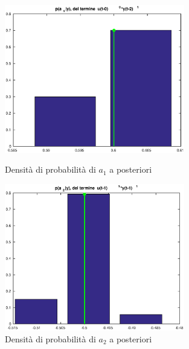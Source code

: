 \documentclass[10pt,a4paper,oneside,openany,noindent]{report}
\begin{document}
\begin{figure}[ht]
\quad
\centering
\begin{minipage}[b]{0.45\linewidth}
\centering
\includegraphics[width=0.7\textwidth]{ak_1.eps} 
\caption{Densità di probabilità di $a_1$ a posteriori}
\label{fig:minipage1}
\end{minipage}
\quad
\begin{minipage}[b]{0.45\linewidth}
\centering
\includegraphics[width=0.7\textwidth]{ak_2.eps}
\caption{Densità di probabilità di $a_2$ a posteriori}
\label{fig:minipage2}
\end{minipage}
\end{figure}
\end{document}
